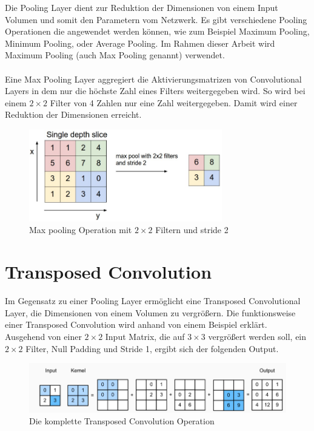 Die Pooling Layer dient zur Reduktion der Dimensionen von einem Input Volumen und somit den Parametern vom Netzwerk. Es gibt
verschiedene Pooling Operationen die angewendet werden können, wie zum Beispiel Maximum Pooling, Minimum Pooling, oder Average Pooling. Im Rahmen
dieser Arbeit wird Maximum Pooling (auch Max Pooling genannt) verwendet.
\\
\\
Eine Max Pooling \gls{Layer} aggregiert die Aktivierungsmatrizen von Convolutional Layers in dem nur die höchste Zahl eines Filters weitergegeben
wird. So wird bei einem $ 2 \times 2 $ Filter von 4 Zahlen nur eine Zahl weitergegeben. Damit wird einer Reduktion der Dimensionen erreicht.

\begin{figure}[H]
  \centering
  \includegraphics[width=0.75\textwidth]{resources/cnn/pooling.png}
  \caption{
    Max pooling Operation mit $ 2 \times 2 $ Filtern und \gls{stride} 2
    \cite{convnet-demo}
  }
  \label{image:pooling}
\end{figure}

\section{Transposed Convolution}
Im Gegensatz zu einer Pooling Layer ermöglicht eine Transposed Convolutional Layer, die Dimensionen von einem Volumen zu vergrößern.
Die funktionsweise einer Transposed Convolution wird anhand von einem Beispiel erklärt.
\\
Ausgehend von einer $ 2 \times 2 $ Input Matrix, die auf $ 3 \times 3 $ vergrößert werden soll, ein $ 2 \times 2 $ Filter,
Null Padding und Stride 1, ergibt sich der folgenden Output.

\begin{figure}[H]
  \centering
  \includegraphics[width=1\textwidth]{resources/cnn/transposed-conv.png}
  \caption{
    Die komplette Transposed Convolution Operation
    \cite{zhang2020dive}
  }
  \label{image:transposed-conv}
\end{figure}

